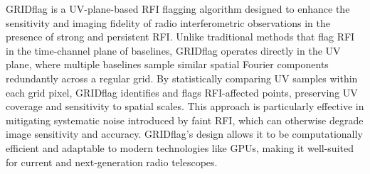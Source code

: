 GRIDflag \citep{10464448} is a UV-plane-based RFI flagging algorithm designed to enhance the sensitivity and imaging fidelity of radio interferometric observations in the presence of strong and persistent RFI. Unlike traditional methods that flag RFI in the time-channel plane of baselines, GRIDflag operates directly in the UV plane, where multiple baselines sample similar spatial Fourier components redundantly across a regular grid. By statistically comparing UV samples within each grid pixel, GRIDflag identifies and flags RFI-affected points, preserving UV coverage and sensitivity to spatial scales. This approach is particularly effective in mitigating systematic noise introduced by faint RFI, which can otherwise degrade image sensitivity and accuracy. GRIDflag's design allows it to be computationally efficient and adaptable to modern technologies like GPUs, making it well-suited for current and next-generation radio telescopes.

